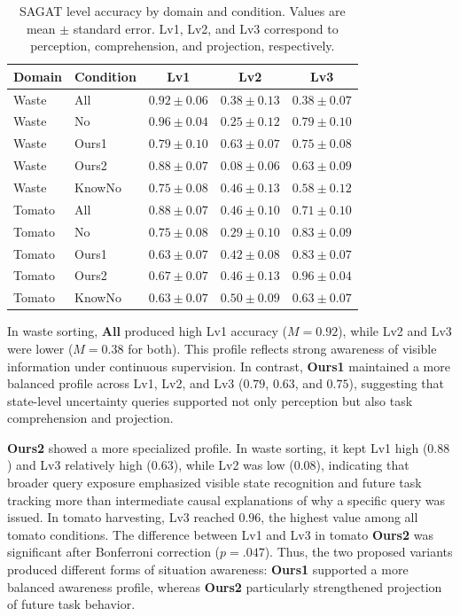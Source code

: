 \begin{table}[t]
\centering
\caption{SAGAT level accuracy by domain and condition. Values are mean $\pm$ standard error. Lv1, Lv2, and Lv3 correspond to perception, comprehension, and projection, respectively.}
\label{tab:user_sagat_levels}
\small
\setlength{\tabcolsep}{4pt}
\begin{tabular*}{\textwidth}{@{\extracolsep{\fill}}llccc}
\toprule
\textbf{Domain} & \textbf{Condition} & \textbf{Lv1} & \textbf{Lv2} & \textbf{Lv3} \\
\midrule
Waste & All & $0.92 \pm 0.06$ & $0.38 \pm 0.13$ & $0.38 \pm 0.07$ \\
Waste & No & $0.96 \pm 0.04$ & $0.25 \pm 0.12$ & $0.79 \pm 0.10$ \\
Waste & Ours1 & $0.79 \pm 0.10$ & $0.63 \pm 0.07$ & $0.75 \pm 0.08$ \\
Waste & Ours2 & $0.88 \pm 0.07$ & $0.08 \pm 0.06$ & $0.63 \pm 0.09$ \\
Waste & KnowNo & $0.75 \pm 0.08$ & $0.46 \pm 0.13$ & $0.58 \pm 0.12$ \\
\midrule
Tomato & All & $0.88 \pm 0.07$ & $0.46 \pm 0.10$ & $0.71 \pm 0.10$ \\
Tomato & No & $0.75 \pm 0.08$ & $0.29 \pm 0.10$ & $0.83 \pm 0.09$ \\
Tomato & Ours1 & $0.63 \pm 0.07$ & $0.42 \pm 0.08$ & $0.83 \pm 0.07$ \\
Tomato & Ours2 & $0.67 \pm 0.07$ & $0.46 \pm 0.13$ & $0.96 \pm 0.04$ \\
Tomato & KnowNo & $0.63 \pm 0.07$ & $0.50 \pm 0.09$ & $0.63 \pm 0.07$ \\
\bottomrule
\end{tabular*}
\end{table}

In waste sorting, \textbf{All} produced high Lv1 accuracy ($M=0.92$), while Lv2 and Lv3 were lower ($M=0.38$ for both). This profile reflects strong awareness of visible information under continuous supervision. In contrast, \textbf{Ours1} maintained a more balanced profile across Lv1, Lv2, and Lv3 ($0.79$, $0.63$, and $0.75$), suggesting that state-level uncertainty queries supported not only perception but also task comprehension and projection.

\textbf{Ours2} showed a more specialized profile. In waste sorting, it kept Lv1 high ($0.88$) and Lv3 relatively high ($0.63$), while Lv2 was low ($0.08$), indicating that broader query exposure emphasized visible state recognition and future task tracking more than intermediate causal explanations of why a specific query was issued. In tomato harvesting, Lv3 reached $0.96$, the highest value among all tomato conditions. The difference between Lv1 and Lv3 in tomato \textbf{Ours2} was significant after Bonferroni correction ($p=.047$). Thus, the two proposed variants produced different forms of situation awareness: \textbf{Ours1} supported a more balanced awareness profile, whereas \textbf{Ours2} particularly strengthened projection of future task behavior.

